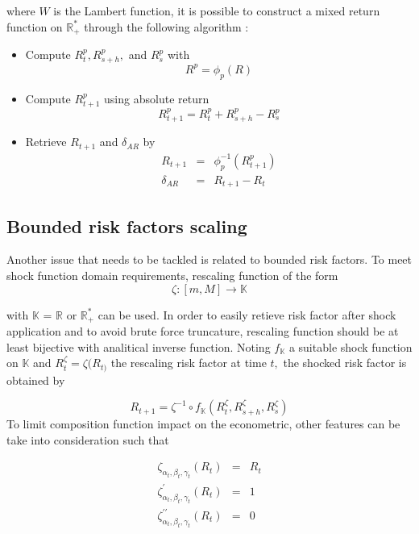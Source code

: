 \documentclass[10pt,a4paper]{report}
\begin{document}
where $W$ is the Lambert function, it is possible to construct a mixed
return function on $\mathbb{R}_{+}^{\ast }$ through the following algorithm :

\bigskip

\begin{itemize}
\item Compute $R_{t}^{p},R_{s+h}^{p},$ and $R_{s}^{p}$ with 
\begin{equation*}
R^{p}=\phi _{p}(R)
\end{equation*}

\item Compute $R_{t+1}^{p}$ using absolute return 
\begin{equation*}
R_{t+1}^{p}=R_{t}^{p}+R_{s+h}^{p}-R_{s}^{p}
\end{equation*}

\item Retrieve $R_{t+1}$ and $\delta _{AR}$ by 
\begin{eqnarray*}
R_{t+1} &=&\phi _{p}^{-1}(R_{t+1}^{p}) \\
\delta _{AR} &=&R_{t+1}-R_{t}
\end{eqnarray*}
\end{itemize}

\subsection{Bounded risk factors scaling}

Another issue that needs to be tackled is related to bounded risk factors.
To meet shock function domain requirements, rescaling function of the form 
\begin{equation*}
\zeta :[m,M]\rightarrow \mathbb{K}
\end{equation*}

with $\mathbb{K}$ = $\mathbb{R}$ or $\mathbb{R}_{+}^{\ast }$ can be used. In
order to easily retieve risk factor after shock application and to avoid
brute force truncature, rescaling function should be at least bijective with
analitical inverse function. Noting $f_{\mathbb{K}}$ a suitable shock
function on $\mathbb{K}$ and $R_{t}^{\zeta }=\zeta (R_{t)}$ the rescaling
risk factor at time $t,$ the shocked risk factor is obtained by

\begin{equation*}
R_{t+1}=\zeta ^{-1}\circ f_{\mathbb{K}}(R_{t}^{\zeta },R_{s+h}^{\zeta
},R_{s}^{\zeta })
\end{equation*}%
To limit composition function impact on the econometric, other features can
be take into consideration such that

\begin{eqnarray*}
\zeta _{\alpha _{t},\beta _{t},\gamma _{t}}(R_{t}) &=&R_{t} \\
\zeta _{\alpha _{t},\beta _{t},\gamma _{t}}^{\prime }(R_{t}) &=&1 \\
\zeta _{\alpha _{t},\beta _{t},\gamma _{t}}^{\prime \prime }(R_{t}) &=&0
\end{eqnarray*}
\end{document}
